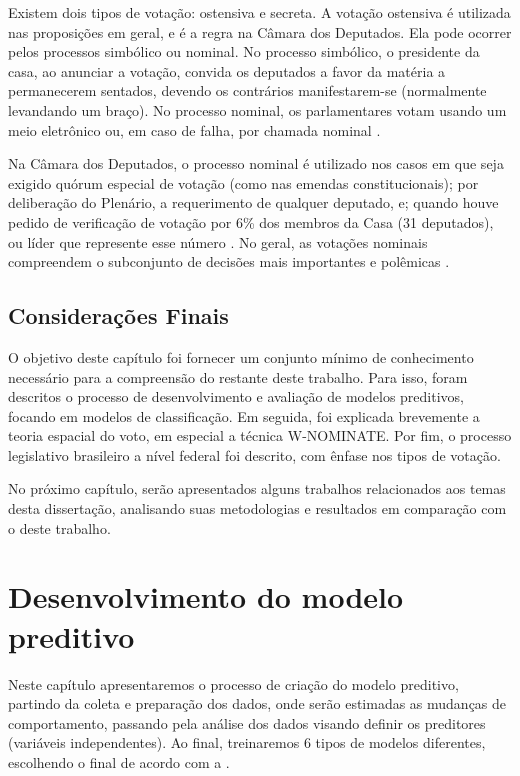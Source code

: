 \documentclass[a4paper,titlepage]{ppgi}\usepackage[]{graphicx}\usepackage[]{color}
\begin{document}
Existem dois tipos de votação: ostensiva e secreta. A votação ostensiva é
utilizada nas proposições em geral, e é a regra na Câmara dos Deputados. Ela
pode ocorrer pelos processos simbólico ou nominal. No processo simbólico, o
presidente da casa, ao anunciar a votação, convida os deputados a favor da
matéria a permanecerem sentados, devendo os contrários manifestarem-se
(normalmente levandando um braço). No processo nominal, os parlamentares votam
usando um meio eletrônico ou, em caso de falha, por chamada nominal
\cite{Carneiro2013}.

Na Câmara dos Deputados, o processo nominal é utilizado nos casos em que seja
exigido quórum especial de votação (como nas emendas constitucionais); por
deliberação do Plenário, a requerimento de qualquer deputado, e; quando houve
pedido de verificação de votação por 6\% dos membros da Casa (31 deputados), ou
líder que represente esse número \cite[art. 186]{RICD2015}. No geral, as
votações nominais compreendem o subconjunto de decisões mais importantes e
polêmicas \cite{Figueiredo2001}.

\section{Considerações Finais}

O objetivo deste capítulo foi fornecer um conjunto mínimo de conhecimento
necessário para a compreensão do restante deste trabalho. Para isso, foram
descritos o processo de desenvolvimento e avaliação de modelos preditivos,
focando em modelos de classificação. Em seguida, foi explicada brevemente a
teoria espacial do voto, em especial a técnica W-NOMINATE. Por fim, o processo
legislativo brasileiro a nível federal foi descrito, com ênfase nos tipos de
votação.

No próximo capítulo, serão apresentados alguns trabalhos relacionados aos temas
desta dissertação, analisando suas metodologias e resultados em comparação com
o deste trabalho.






\chapter{Desenvolvimento do modelo preditivo}\label{cap:desenvolvimento}

Neste capítulo apresentaremos o processo de criação do modelo preditivo,
partindo da coleta e preparação dos dados, onde serão estimadas as mudanças de
comportamento, passando pela análise dos dados visando definir os preditores
(variáveis independentes). Ao final, treinaremos 6 tipos de modelos diferentes,
escolhendo o final de acordo com a .
\end{document}
